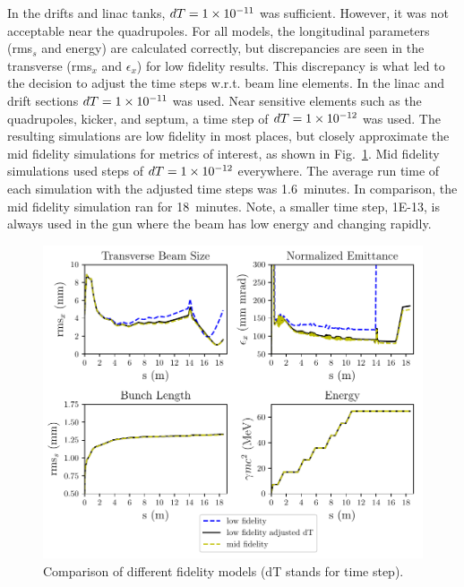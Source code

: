 In the drifts and linac tanks, $dT=\num{1E-11}$ was sufficient. 
However, it was not acceptable near the quadrupoles. 
For all models, the longitudinal parameters (rms$_s$ and energy) 
are calculated correctly, but discrepancies are seen in the transverse 
(rms$_x$ and $\epsilon_x$) for low fidelity results. This discrepancy is 
what led to the decision to adjust the time steps w.r.t. beam line elements. 
In the linac and drift sections $dT=\num{1E-11}$ was used. 
Near sensitive elements such as the quadrupoles, kicker, and septum, 
a time step of $dT=\num{1E-12}$ was used.
The resulting simulations are low fidelity in most places, but closely approximate 
the mid fidelity simulations for metrics of interest, as shown in 
Fig.~\ref{tstep}.  Mid fidelity simulations used steps of  $dT=\num{1E-12}$ everywhere.
The average run time of each simulation with the adjusted time steps was 1.6~minutes.
In comparison, the mid fidelity simulation ran for 18~minutes.
Note, a smaller time step, \num{1E-13}, is always used in the gun where the 
beam has low energy and changing rapidly.

\begin{figure}%
	\centering
	\includegraphics[width=\linewidth]{figures/timestep_comparison_paper}
	\caption{Comparison of different fidelity models (dT stands for time step).}
	\label{tstep}
\end{figure}

